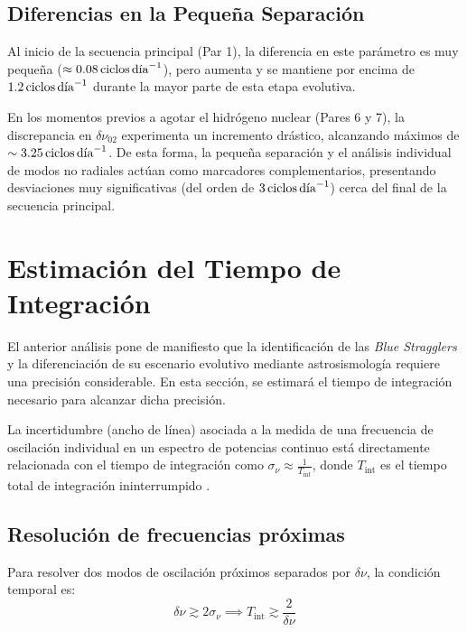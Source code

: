 \subsection{Diferencias en la Pequeña Separación}

Al inicio de la secuencia principal (Par 1), la diferencia en este parámetro es muy pequeña ($\approx 0.08\,\text{ciclos\,día}^{-1}$), pero aumenta y se mantiene por encima de $1.2\,\text{ciclos\,día}^{-1}$ durante la mayor parte de esta etapa evolutiva.

En los momentos previos a agotar el hidrógeno nuclear (Pares 6 y 7), la discrepancia en $\delta\nu_{02}$ experimenta un incremento drástico, alcanzando máximos de $\sim 3.25\,\text{ciclos\,día}^{-1}$. De esta forma, la pequeña separación y el análisis individual de modos no radiales actúan como marcadores complementarios, presentando desviaciones muy significativas (del orden de $3\,\text{ciclos\,día}^{-1}$) cerca del final de la secuencia principal.

\section{Estimación del Tiempo de Integración}

El anterior análisis pone de manifiesto que la identificación de las \textit{Blue Stragglers} y la diferenciación de su escenario evolutivo mediante astrosismología requiere una precisión considerable. En esta sección, se estimará el tiempo de integración necesario para alcanzar dicha precisión.

La incertidumbre (ancho de línea) asociada a la medida de una frecuencia de oscilación individual en un espectro de potencias continuo está directamente relacionada con el tiempo de integración como $\sigma_\nu \approx \frac{1}{T_{\mathrm{int}}}$, donde $T_{\mathrm{int}}$ es el tiempo total de integración ininterrumpido \citep{ChristensenDalsgaard2019}.

\subsection{Resolución de frecuencias próximas}

Para resolver dos modos de oscilación próximos separados por $\delta\nu$, la condición temporal es:
\begin{equation}
  \delta\nu \gtrsim 2 \sigma_\nu \implies T_{\mathrm{int}} \gtrsim \frac{2}{\delta\nu}
\end{equation}

